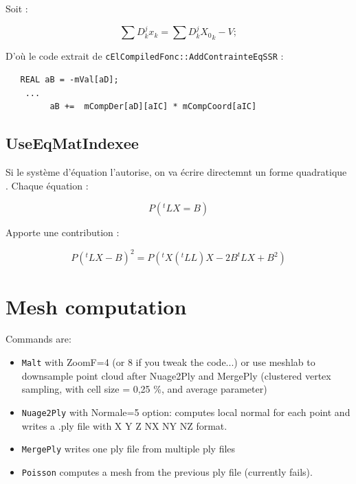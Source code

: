 Soit  :

\begin{equation}
    \sum{D^j_k x_k} =   \sum{D^j_k {X_0}_k} -V;
\end{equation}

D'o\`u le code extrait de {\tt cElCompiledFonc::AddContrainteEqSSR} :

\begin{verbatim}
   REAL aB = -mVal[aD];
    ...
         aB +=  mCompDer[aD][aIC] * mCompCoord[aIC]
\end{verbatim}


\subsection{UseEqMatIndexee}


Si le syst\`eme d'\'equation l'autorise, on va \'ecrire directemnt un forme
quadratique . Chaque \'equation :

\begin{equation}
    P (^t L  X =  B)
\end{equation}

Apporte une contribution :

\begin{equation}
    P (^t L  X -  B) ^2  = P (^t X (^tLL)X  -2B^tL X + B^2)
\end{equation}

\section{Mesh computation}

Commands are:

\begin{itemize}
\item {\tt Malt} with ZoomF=4 (or 8 if you tweak the code...) or use meshlab to downsample point cloud after Nuage2Ply and MergePly (clustered vertex sampling, with cell size = 0,25 \%, and average parameter)
\item {\tt Nuage2Ply} with Normale=5 option: computes local normal for each point and writes a .ply file with X Y Z NX NY NZ format.
\item {\tt MergePly} writes one ply file from multiple ply files
\item {\tt Poisson} computes a mesh from the previous ply file
 (currently fails).
\end{itemize}

